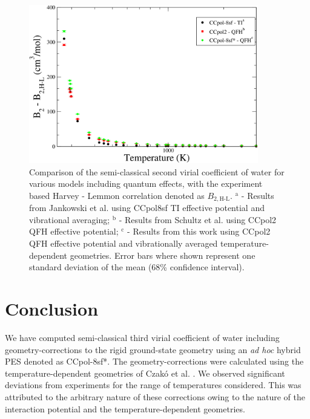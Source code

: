         \begin{figure}[!htbp]
            \centering
            \includegraphics[width=10cm,keepaspectratio]{Chapter-7/Figures/B2SCAll.png}
            \caption{Comparison of the semi-classical second virial coefficient of water for various models including quantum effects, with the experiment based Harvey - Lemmon correlation \cite{Harvey2004} denoted as $B_{2,\text{H-L}}$. $^\text{a}$ - Results from Jankowski et al. \cite{Jankowski2015} using CCpol8sf TI effective potential and vibrational averaging; $^\text{b}$ - Results from Schultz et al. \cite{Schultz2015} using CCpol2 QFH effective potential; $^\text{c}$ - Results from this work using CCpol2 QFH effective potential and vibrationally averaged temperature-dependent geometries. Error bars where shown represent one standard deviation of the mean (68\% confidence interval).}
            \label{fig:B2SC-comparison}
        \end{figure}

    \section{Conclusion}
    \label{chap7-sec:conclusion}
        We have computed semi-classical third virial coefficient of water including geometry-corrections to the rigid ground-state geometry using an \emph{ad hoc} hybrid PES denoted as CCpol-8sf*. The geometry-corrections were calculated using the temperature-dependent geometries of Czak\'{o} et al. \cite{Czako2009}. We observed significant deviations from experiments for the range of temperatures considered. This was attributed to the arbitrary nature of these corrections owing to the nature of the interaction potential and the temperature-dependent geometries.

